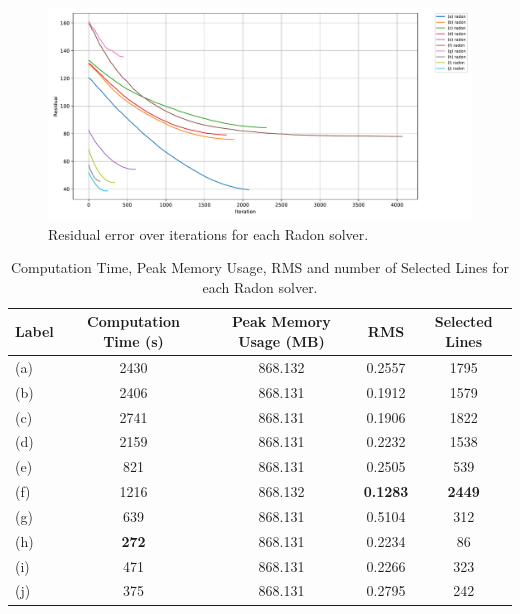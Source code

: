 \begin{figure}[H]
    \centering
    \includegraphics[width=\linewidth]{images/radon/residual_history.pdf}
    \caption{Residual error over iterations for each Radon solver.}
    \label{fig:radon_norm_error}
\end{figure}

\begin{table}[!ht]
\centering
\caption{Computation Time, Peak Memory Usage, RMS and number of Selected Lines for each Radon solver.}
\begin{tabularx}{\textwidth}{l C C C C}
\toprule
\textbf{Label} & \textbf{Computation Time (s)} & \textbf{Peak Memory Usage (MB)} & \textbf{RMS} & \textbf{Selected Lines} \\
\midrule
(a) & 2430            & 868.132            & 0.2557            & 1795 \\
(b) & 2406            & 868.131            & 0.1912            & 1579 \\
(c) & 2741            & 868.131            & 0.1906            & 1822 \\
(d) & 2159            & 868.131            & 0.2232            & 1538 \\
(e) &  821            & 868.131            & 0.2505            &  539 \\
(f) & 1216            & 868.132            & \textbf{0.1283}   & \textbf{2449} \\
(g) &  639            & 868.131            & 0.5104            &  312 \\
(h) &  \textbf{272}   & 868.131            & 0.2234            &   86 \\
(i) &  471            & 868.131            & 0.2266            &  323 \\
(j) &  375            & 868.131            & 0.2795            &  242 \\
\bottomrule
\end{tabularx}
\end{table}